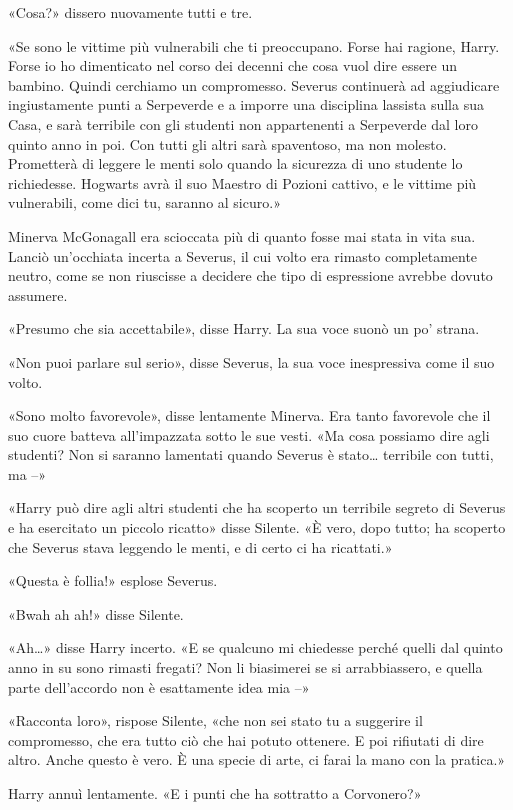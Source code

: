«Cosa?» dissero nuovamente tutti e tre.

«Se sono le vittime più vulnerabili che ti preoccupano. Forse hai ragione, Harry. Forse io ho dimenticato nel corso dei decenni che cosa vuol dire essere un bambino. Quindi cerchiamo un compromesso. Severus continuerà ad aggiudicare ingiustamente punti a Serpeverde e a imporre una disciplina lassista sulla sua Casa, e sarà terribile con gli studenti non appartenenti a Serpeverde dal loro quinto anno in poi. Con tutti gli altri sarà spaventoso, ma non molesto. Prometterà di leggere le menti solo quando la sicurezza di uno studente lo richiedesse. Hogwarts avrà il suo Maestro di Pozioni cattivo, e le vittime più vulnerabili, come dici tu, saranno al sicuro.»

Minerva McGonagall era scioccata più di quanto fosse mai stata in vita sua. Lanciò un’occhiata incerta a Severus, il cui volto era rimasto completamente neutro, come se non riuscisse a decidere che tipo di espressione avrebbe dovuto assumere.

«Presumo che sia accettabile», disse Harry. La sua voce suonò un po’ strana.

«Non puoi parlare sul serio», disse Severus, la sua voce inespressiva come il suo volto.

«Sono molto favorevole», disse lentamente Minerva. Era tanto favorevole che il suo cuore batteva all’impazzata sotto le sue vesti. «Ma cosa possiamo dire agli studenti? Non si saranno lamentati quando Severus è stato… terribile con tutti, ma –»

«Harry può dire agli altri studenti che ha scoperto un terribile segreto di Severus e ha esercitato un piccolo ricatto» disse Silente. «È vero, dopo tutto; ha scoperto che Severus stava leggendo le menti, e di certo ci ha ricattati.»

«Questa è follia!» esplose Severus.

«Bwah ah ah!» disse Silente.

«Ah…» disse Harry incerto. «E se qualcuno mi chiedesse perché quelli dal quinto anno in su sono rimasti fregati? Non li biasimerei se si arrabbiassero, e quella parte dell’accordo non è esattamente idea mia –»

«Racconta loro», rispose Silente, «che non sei stato tu a suggerire il compromesso, che era tutto ciò che hai potuto ottenere. E poi rifiutati di dire altro. Anche questo è vero. È una specie di arte, ci farai la mano con la pratica.»

Harry annuì lentamente. «E i punti che ha sottratto a Corvonero?»

